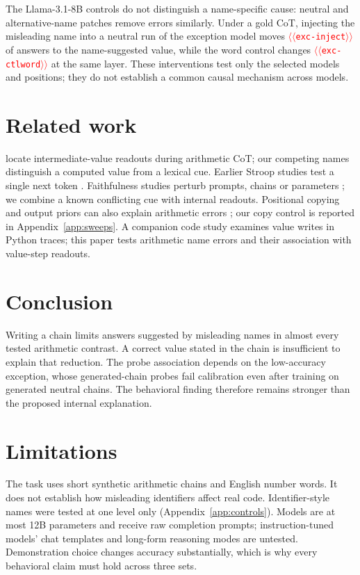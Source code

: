 \documentclass[11pt]{article}
\providecommand{\NUM}[1]{\textcolor{red}{$\langle\langle$\texttt{#1}$\rangle\rangle$}}
\begin{document}
The Llama-3.1-8B controls do not distinguish a name-specific cause: neutral and alternative-name
patches remove errors similarly. Under a gold CoT, injecting the misleading name into a neutral
run of the exception model moves \NUM{exc-inject} of answers to the name-suggested value, while the word control
changes \NUM{exc-ctlword} at the same layer. These interventions test only the selected models and positions; they do not establish a common causal mechanism across models.



\section{Related work}

\citet{kudo2026faithful} locate intermediate-value readouts during arithmetic CoT; our competing
names distinguish a computed value from a lexical cue. Earlier Stroop studies test a single next
token \cite{wang2026stroop,hu2026conflict}. Faithfulness studies perturb prompts, chains or
parameters \cite{turpin2023unfaithful,lanham2023measuring,chen2025reasoning,tutek2025unlearning};
we combine a known conflicting cue with internal readouts. Positional copying and output priors
can also explain arithmetic errors \cite{liu2026readout,prabhakar2024deciphering}; our copy
control is reported in Appendix~\ref{app:sweeps}.
A companion code study \citep{anon2026code} examines value writes in Python traces; this
paper tests arithmetic name errors and their association with value-step readouts.

\section{Conclusion}

Writing a chain limits answers suggested by misleading names in almost every tested arithmetic contrast.
A correct value stated in the chain is insufficient to explain that reduction. The probe
association depends on the low-accuracy exception, whose generated-chain probes fail calibration
even after training on generated neutral chains.
The behavioral finding therefore remains stronger than the proposed internal explanation.

\section*{Limitations}

The task uses short synthetic arithmetic chains and English number words. It does not establish
how misleading identifiers affect real code. Identifier-style names were tested at one level
only (Appendix~\ref{app:controls}). Models are at most 12B parameters and receive raw completion
prompts; instruction-tuned models' chat templates and long-form reasoning modes are untested.
Demonstration choice changes accuracy substantially, which is why every behavioral claim must
hold across three sets.
\end{document}
